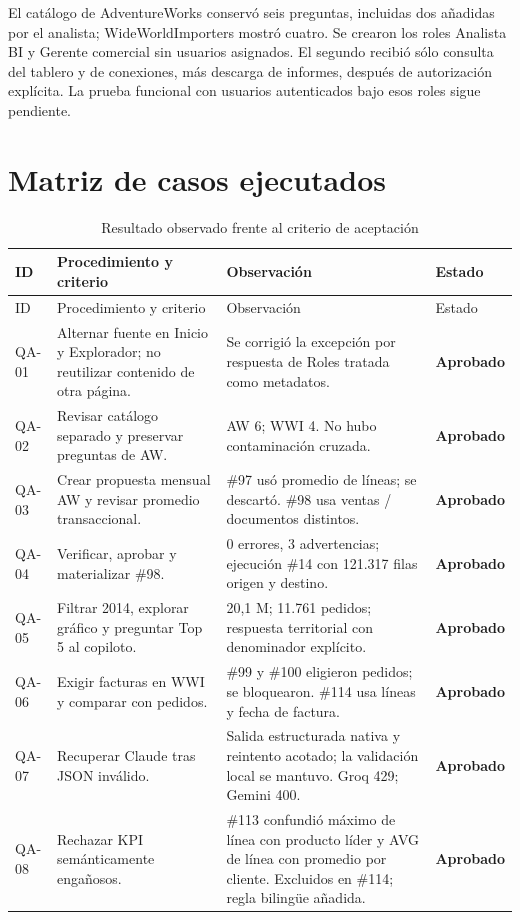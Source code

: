 \documentclass[10pt,letterpaper]{article}
\newcommand{\ok}{\textcolor{verde}{\textbf{Aprobado}}}
\begin{document}
El catálogo de AdventureWorks conservó seis preguntas, incluidas dos añadidas por el analista; WideWorldImporters mostró cuatro. Se crearon los roles Analista BI y Gerente comercial sin usuarios asignados. El segundo recibió sólo consulta del tablero y de conexiones, más descarga de informes, después de autorización explícita. La prueba funcional con usuarios autenticados bajo esos roles sigue pendiente.

\section{Matriz de casos ejecutados}
\small
\begin{longtable}{@{}p{}p{}p{}p{}@{}}
\caption{Resultado observado frente al criterio de aceptación}\\\toprule
ID & Procedimiento y criterio & Observación & Estado\\\midrule\endfirsthead
\toprule ID & Procedimiento y criterio & Observación & Estado\\\midrule\endhead
QA-01 & Alternar fuente en Inicio y Explorador; no reutilizar contenido de otra página. & Se corrigió la excepción por respuesta de Roles tratada como metadatos. & \ok\\
QA-02 & Revisar catálogo separado y preservar preguntas de AW. & AW 6; WWI 4. No hubo contaminación cruzada. & \ok\\
QA-03 & Crear propuesta mensual AW y revisar promedio transaccional. & \#97 usó promedio de líneas; se descartó. \#98 usa ventas / documentos distintos. & \ok\\
QA-04 & Verificar, aprobar y materializar \#98. & 0 errores, 3 advertencias; ejecución \#14 con 121.317 filas origen y destino. & \ok\\
QA-05 & Filtrar 2014, explorar gráfico y preguntar Top 5 al copiloto. & 20,1 M; 11.761 pedidos; respuesta territorial con denominador explícito. & \ok\\
QA-06 & Exigir facturas en WWI y comparar con pedidos. & \#99 y \#100 eligieron pedidos; se bloquearon. \#114 usa líneas y fecha de factura. & \ok\\
QA-07 & Recuperar Claude tras JSON inválido. & Salida estructurada nativa y reintento acotado; la validación local se mantuvo. Groq 429; Gemini 400. & \ok\\
QA-08 & Rechazar KPI semánticamente engañosos. & \#113 confundió máximo de línea con producto líder y AVG de línea con promedio por cliente. Excluidos en \#114; regla bilingüe añadida. & \ok\\

\end{longtable}
\end{document}
